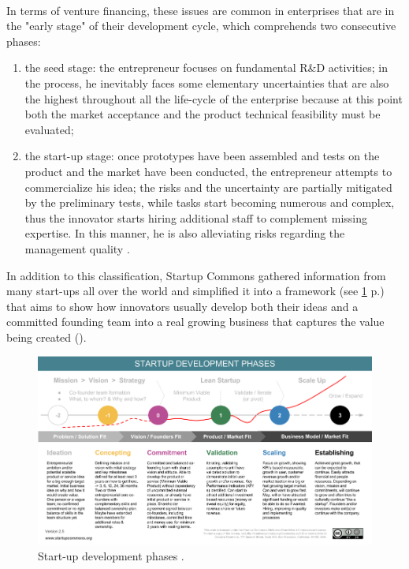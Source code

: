 \documentclass[twoside]{report}
\begin{document}
\paragraph{}
In terms of venture financing, these issues are common in enterprises that are in the "early stage" of their development cycle, which comprehends two consecutive phases: 
\begin{enumerate}
\item the seed stage: the entrepreneur focuses on fundamental R\&D activities; in the process, he inevitably faces some elementary uncertainties that are also the highest throughout all the life-cycle of the enterprise because at this point both the market acceptance and the product technical feasibility must be evaluated;
\item the start-up stage: once prototypes have been assembled and tests on the product and the market have been conducted, the entrepreneur attempts to commercialize his idea; the risks and the uncertainty are partially mitigated by the preliminary tests, while tasks start becoming numerous and complex, thus the innovator starts hiring additional staff to complement missing expertise. In this manner, he is also alleviating risks regarding the management quality \cite{eckermann_venture_2006}.
\end{enumerate}
In addition to this classification, Startup Commons gathered information from many start-ups all over the world and simplified it into a framework (see \ref{fig:framework} p.\pageref{fig:framework}) that aims to show how innovators usually develop both their ideas and a committed founding team into a real growing business that captures the value being created (\cite{commons_startup_2015}).
\begin{figure}
\begin{center}
\includegraphics[width=\linewidth]{development_phases.png}
\caption{Start-up development phases \cite{startup_commons_startup_2015}.}
\label{fig:framework}
\end{center}
\end{figure}
\end{document}
